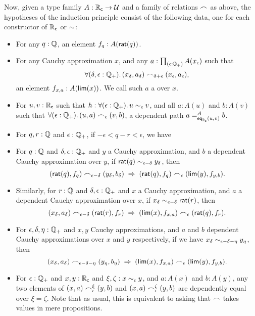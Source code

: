 Now, given a type family $A:\RC\to\type$ and a family of relations $\bsim$ as above, the hypotheses of the induction principle consist of the following data, one for each constructor of $\RC$ or $\closesym$:
\begin{itemize}
\item For any $q : \Q$, an element $f_q:A(\rcrat(q))$.
\item For any Cauchy approximation $x$, and any $a:\prd{\epsilon:\Qp} A(x_\epsilon)$ such that
  \begin{equation}
    \fall{\delta, \epsilon : \Qp}
    (x_\delta,a_\delta) \bsim_{\delta+\epsilon} (x_\epsilon,a_\epsilon),
    \label{eq:depCauchyappx}
  \end{equation}
  an element $f_{x,a}:A(\rclim(x))$.
  We call such $a$ a 
  over $x$.
\item For $u, v : \RC$ such that $h:\fall{\epsilon : \Qp} u \close\epsilon v$, and all $a:A(u)$ and $b:A(v)$ such that
  $\fall{\epsilon:\Qp} (u,a) \bsim_\epsilon (v,b)$,
  a dependent path $\dpath{A}{\rceq(u,v)}{a}{b}$.
\item For $q,r:\Q$ and $\epsilon:\Qp$, if $-\epsilon < q - r < \epsilon$, we have
\item For $q:\Q$ and $\delta,\epsilon:\Qp$ and $y$ a Cauchy approximation, and $b$ a dependent Cauchy approximation over $y$, if $\rcrat(q) \close{\epsilon - \delta} y_\delta$, then
  \[(\rcrat(q),f_q) \bsim_{\epsilon-\delta} (y_\delta,b_\delta)
  \;\Rightarrow\;
  (\rcrat(q),f_q) \bsim_\epsilon (\rclim(y),f_{y,b}).\]
\item Similarly, for $r:\Q$ and $\delta,\epsilon:\Qp$ and $x$ a Cauchy approximation, and $a$ a dependent Cauchy approximation over $x$, if $x_\delta \close{\epsilon - \delta} \rcrat(r)$, then
  \[(x_\delta,a_\delta) \bsim_{\epsilon-\delta} (\rcrat(r),f_r)
  \;\Rightarrow\;
  (\rclim(x),f_{x,a}) \bsim_\epsilon (\rcrat(q),f_r).
  \]
\item For $\epsilon,\delta,\eta:\Qp$ and $x,y$ Cauchy approximations, and $a$ and $b$ dependent Cauchy approximations over $x$ and $y$ respectively, if we have $x_\delta \close{\epsilon - \delta - \eta} y_\eta$, then
  \[ (x_\delta,a_\delta) \bsim_{\epsilon - \delta - \eta} (y_\eta,b_\eta)
  \;\Rightarrow\;
  (\rclim(x),f_{x,a}) \bsim_\epsilon (\rclim(y),f_{y,b}).\]
\item For $\epsilon:\Qp$ and $x,y:\RC$ and $\xi,\zeta:x\close{\epsilon} y$, and $a:A(x)$ and $b:A(y)$, any two elements of $(x,a) \bsim_\epsilon^\xi (y,b)$ and $(x,a) \bsim_\epsilon^\zeta (y,b)$ are dependently equal over $\xi=\zeta$.
  Note that as usual, this is equivalent to asking that $\bsim$ takes values in mere propositions.
\end{itemize}
